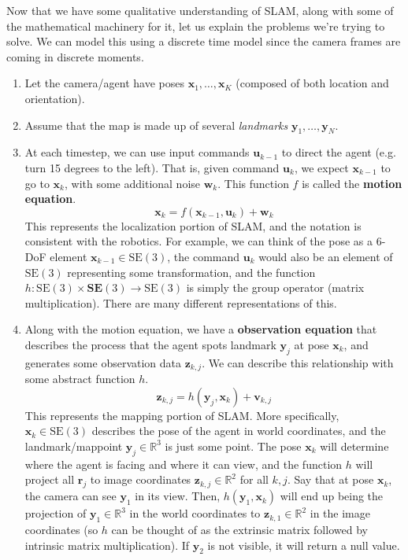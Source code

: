 \documentclass{article}
\newcounter{example}[section]
\begin{document}
  Now that we have some qualitative understanding of SLAM, along with some of the mathematical machinery for it, let us explain the problems we're trying to solve. We can model this using a discrete time model since the camera frames are coming in discrete moments. 
  \begin{enumerate}
      \item Let the camera/agent have poses $\mathbf{x}_1, \ldots, \mathbf{x}_K$ (composed of both location and orientation). 
      \item Assume that the map is made up of several \textit{landmarks} $\mathbf{y}_1, \ldots, \mathbf{y}_N$. 
      \item At each timestep, we can use input commands $\mathbf{u}_{k-1}$ to direct the agent (e.g. turn 15 degrees to the left). That is, given command $\mathbf{u}_k$, we expect $\mathbf{x}_{k-1}$ to go to $\mathbf{x}_{k}$, with some additional noise $\mathbf{w}_k$. This function $f$ is called the \textbf{motion equation}. 
      \begin{equation}
        \mathbf{x}_{k} = f(\mathbf{x}_{k-1}, \mathbf{u}_k) + \mathbf{w}_k
      \end{equation}
      This represents the localization portion of SLAM, and the notation is consistent with the robotics. For example, we can think of the pose as a 6-DoF element $\mathbf{x}_{k-1} \in \mathrm{SE}(3)$, the command $\mathbf{u}_k$ would also be an element of $\mathrm{SE}(3)$ representing some transformation, and the function $h: \mathrm{SE}(3) \times \mathbf{SE}(3) \to \mathrm{SE}(3)$ is simply the group operator (matrix multiplication). There are many different representations of this. 
      
      \item Along with the motion equation, we have a \textbf{observation equation} that describes the process that the agent spots landmark $\mathbf{y}_j$ at pose $\mathbf{x}_k$, and generates some observation data $\mathbf{z}_{k, j}$. We can describe this relationship with some abstract function $h$. 
      \begin{equation}
        \mathbf{z}_{k, j} = h (\mathbf{y}_j , \mathbf{x}_k) + \mathbf{v}_{k, j}
      \end{equation}
      This represents the mapping portion of SLAM. More specifically, $\mathbf{x}_k \in \mathrm{SE}(3)$ describes the pose of the agent in world coordinates, and the landmark/mappoint $\mathbf{y}_j \in \mathbb{R}^3$ is just some point. The pose $\mathbf{x}_k$ will determine where the agent is facing and where it can view, and the function $h$ will project all $\mathbf{r}_j$ to image coordinates $\mathbf{z}_{k, j} \in \mathbb{R}^2$ for all $k, j$. Say that at pose $\mathbf{x}_k$, the camera can see $\mathbf{y}_1$ in its view. Then, $h(\mathbf{y}_1, \mathbf{x}_k)$ will end up being the projection of $\mathbf{y}_1 \in \mathbb{R}^3$ in the world coordinates to $\mathbf{z}_{k, 1} \in \mathbb{R}^2$ in the image coordinates (so $h$ can be thought of as the extrinsic matrix followed by intrinsic matrix multiplication). If $\mathbf{y}_2$ is not visible, it will return a null value. 
  \end{enumerate}
\end{document}
